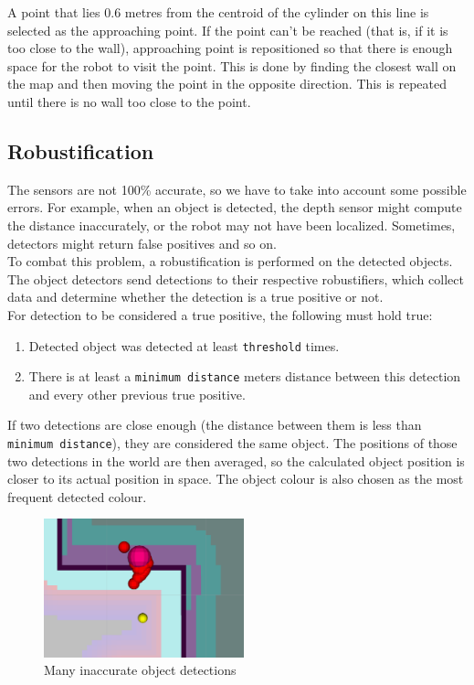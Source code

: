 \documentclass[12pt,a4paper]{article}
\begin{document}
	A point that lies 0.6 metres from the centroid of the cylinder on this line is selected as the approaching point. If the point can't be reached (that is, if it is too close to the wall), approaching point is repositioned so that there is enough space for the robot to visit the point. This is done by finding the closest wall on the map and then moving the point in the opposite direction. This is repeated until there is no wall too close to the point. \\
	
	\subsection{Robustification} \label{robustification}
	The sensors are not 100\% accurate, so we have to take into account some possible errors. For example, when an object is detected, the depth sensor might compute the distance inaccurately, or the robot may not have been localized. Sometimes, detectors might return false positives and so on. \\
	
	To combat this problem, a robustification is performed on the detected objects. The object detectors send detections to their respective robustifiers, which collect data and determine whether the detection is a true positive or not. \\
	
	For detection to be considered a true positive, the following must hold true:
	\begin{enumerate}
		\item Detected object was detected at least \texttt{threshold} times.
		\item There is at least a \texttt{minimum distance} meters distance between this detection and every other previous true positive.
	\end{enumerate}

	If two detections are close enough (the distance between them is less than \texttt{minimum distance}), they are considered the same object. The positions of those two detections in the world are then averaged, so the calculated object position is closer to its actual position in space. The object colour is also chosen as the most frequent detected colour. \\
	
	\begin{figure}[h]
		\centering
		\includegraphics[height=4cm]{images/detections}
		\caption{Many inaccurate object detections}
		\label{fig:inaccurate_detections}
	\end{figure}
\end{document}
